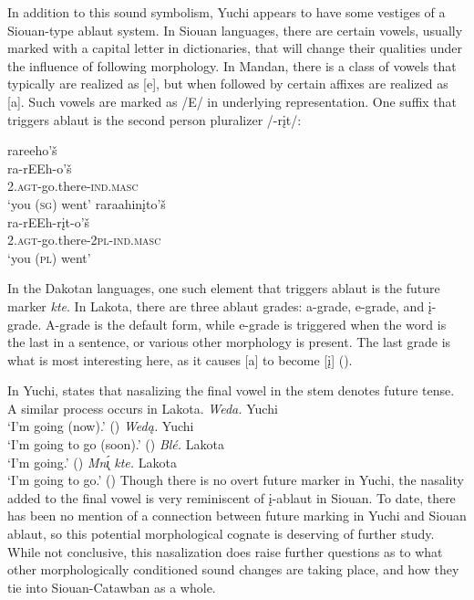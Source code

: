 \documentclass[output=paper]{LSP/langsci}
\begin{document}
In addition to this sound symbolism, Yuchi appears to have some vestiges of a Siouan-type ablaut system. In Siouan languages, there are certain vowels, usually marked with a capital letter in dictionaries, that will change their qualities under the influence of following morphology. In Mandan, there is a class of vowels that typically are realized as [e], but when followed by certain affixes are realized as [a]. Such vowels are marked as /E/ in underlying representation. One suffix that triggers ablaut is the second person pluralizer /-r\k{i}t/:

\ea
	\ea 
	\glll rareeho'\v{s} \\
	ra-rEEh-o'\v{s} \\	
	\textsc{2.agt}-go.there-\textsc{ind.masc} \\
	\glt	`you (\textsc{sg}) went'
	\ex 
	\glll raraahin\k{i}to'\v{s}\\
	ra-rEEh-r\k{i}t-o'\v{s}\\	
	\textsc{2.agt}-go.there-\textsc{2pl-ind.masc}\\
	\glt	`you (\textsc{pl}) went'
	\z
\z

In the Dakotan languages, one such element that triggers ablaut is the future marker \emph{kte}. In Lakota, there are three ablaut grades: a-grade, e-grade, and \k{i}-grade. A-grade is the default form, while e-grade is triggered when the word is the last in a sentence, or various other morphology is present. The last grade is what is most interesting here, as it causes [a] to become [\k{i}] (\citealt{Ullrich2008}).

In Yuchi, \citet{Linn2000} states that nasalizing the final vowel in the stem denotes future tense. A similar process occurs in Lakota.
\ea
	\ea \textit{Weda.} \hfill Yuchi\\
		`I'm going (now).' (\citealt[279]{Linn2000})
	\ex \textit{Wed\k{a}.} \hfill Yuchi\\
		`I'm going to go (soon).' (\citealt[279]{Linn2000})
	\ex \textit{Bl\'e.} \hfill Lakota\\
		`I'm going.' (\citealt[75]{Ullrich2008})
	\ex \textit{Mn\k{\'\i} kte.} \hfill Lakota\\
		`I'm going to go.' (\citealt[75]{Ullrich2008})
	\z
\z
Though there is no overt future marker in Yuchi, the nasality added to the final vowel is very reminiscent of \k{i}-ablaut in Siouan. To date, there has been no mention of a connection between future marking in Yuchi and Siouan ablaut, so this potential morphological cognate is deserving of further study. While not conclusive, this nasalization does raise further questions as to what other morphologically conditioned sound changes are taking place, and how they tie into Siouan-Catawban as a whole.
\end{document}
